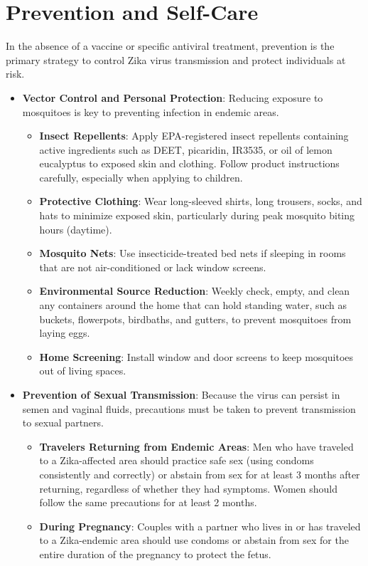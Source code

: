 \section*{Prevention and Self-Care}
In the absence of a vaccine or specific antiviral treatment, prevention is the primary strategy to control Zika virus transmission and protect individuals at risk.
\begin{itemize}
\item \textbf{Vector Control and Personal Protection}: Reducing exposure to mosquitoes is key to preventing infection in endemic areas.
  \begin{itemize}
  \item \textbf{Insect Repellents}: Apply EPA-registered insect repellents containing active ingredients such as DEET, picaridin, IR3535, or oil of lemon eucalyptus to exposed skin and clothing. Follow product instructions carefully, especially when applying to children.
  \item \textbf{Protective Clothing}: Wear long-sleeved shirts, long trousers, socks, and hats to minimize exposed skin, particularly during peak mosquito biting hours (daytime).
  \item \textbf{Mosquito Nets}: Use insecticide-treated bed nets if sleeping in rooms that are not air-conditioned or lack window screens.
  \item \textbf{Environmental Source Reduction}: Weekly check, empty, and clean any containers around the home that can hold standing water, such as buckets, flowerpots, birdbaths, and gutters, to prevent mosquitoes from laying eggs.
  \item \textbf{Home Screening}: Install window and door screens to keep mosquitoes out of living spaces.
  \end{itemize}
\item \textbf{Prevention of Sexual Transmission}: Because the virus can persist in semen and vaginal fluids, precautions must be taken to prevent transmission to sexual partners.
  \begin{itemize}
  \item \textbf{Travelers Returning from Endemic Areas}: Men who have traveled to a Zika-affected area should practice safe sex (using condoms consistently and correctly) or abstain from sex for at least 3 months after returning, regardless of whether they had symptoms. Women should follow the same precautions for at least 2 months.
  \item \textbf{During Pregnancy}: Couples with a partner who lives in or has traveled to a Zika-endemic area should use condoms or abstain from sex for the entire duration of the pregnancy to protect the fetus.

\end{itemize}
\end{itemize}
